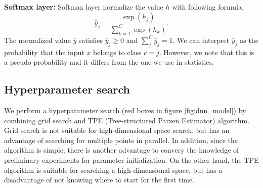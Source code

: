 \documentclass[useamsfonts]{pasj01}
\begin{document}
{\bf Softmax layer:}
Softmax layer normalize the value $h$ with following formula,
\begin{equation}
    \hat{y}_j = \frac{\exp \left( h_j \right)}{\sum_{k=1}^C \exp \left( h_k \right)}.
\end{equation}
The normalized value $\hat{y}$ satisfies $\hat{y}_j \geq 0$ and $\sum_j^C \hat{y}_j =1$.
We can interpret $\hat{y}_j$ as the probability that the input $x$ belongs to  class $c=j$.
However, we note that this is a pseudo probability and it differs from the one we use in statistics.
  
\subsection{Hyperparameter search}\label{hyperparametersearch}
We perform a hyperparameter search (red boxes in figure \ref{fig:dnn_model}) by combining grid search and TPE (Tree-structured Parzen Estimator) algorithm.
Grid search is not suitable for high-dimensional space search, but has an advantage of searching for multiple points in parallel.
In addition, since the algorithm is simple, there is another advantage to convery the knowledge of preliminary experiments for parameter initialization.
On the other hand, the TPE algorithm is suitable for searching a high-dimensional space, but has a disadvantage of not knowing where to start for the first time.
\end{document}

